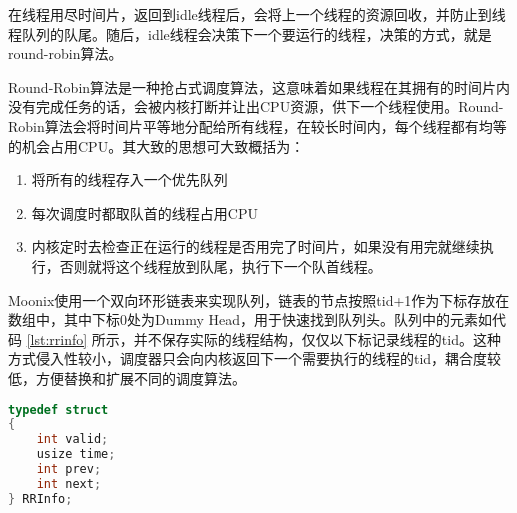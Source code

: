 在线程用尽时间片，返回到idle线程后，会将上一个线程的资源回收，并防止到线程队列的队尾。随后，idle线程会决策下一个要运行的线程，决策的方式，就是round-robin算法。

Round-Robin算法是一种抢占式调度算法，这意味着如果线程在其拥有的时间片内没有完成任务的话，会被内核打断并让出CPU资源，供下一个线程使用。Round-Robin算法会将时间片平等地分配给所有线程，在较长时间内，每个线程都有均等的机会占用CPU。其大致的思想可大致概括为：

\begin{enumerate}
	\item 将所有的线程存入一个优先队列
	\item 每次调度时都取队首的线程占用CPU
	\item 内核定时去检查正在运行的线程是否用完了时间片，如果没有用完就继续执行，否则就将这个线程放到队尾，执行下一个队首线程。
\end{enumerate}

Moonix使用一个双向环形链表来实现队列，链表的节点按照tid+1作为下标存放在数组中，其中下标0处为Dummy Head，用于快速找到队列头。队列中的元素如代码 \ref{lst:rrinfo} 所示，并不保存实际的线程结构，仅仅以下标记录线程的tid。这种方式侵入性较小，调度器只会向内核返回下一个需要执行的线程的tid，耦合度较低，方便替换和扩展不同的调度算法。

\begin{lstlisting}[language={C}, caption={线程调度器元素}, label={lst:rrinfo}]
typedef struct
{
	int valid;
	usize time;
	int prev;
	int next;
} RRInfo;
\end{lstlisting}